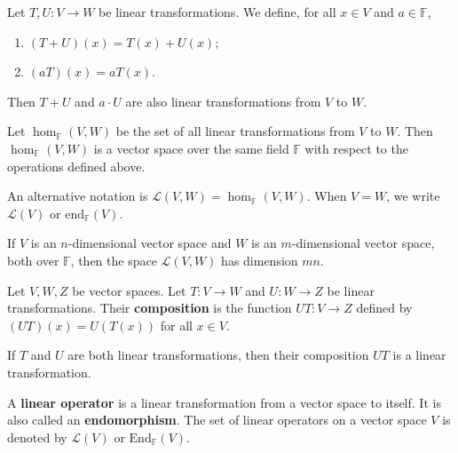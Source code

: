 \begin{theorem}
	Let $T, U : V \longrightarrow W$ be linear transformations. We define, for all $x \in V$ and $a \in \mathbb{F}$,
	\begin{enumerate}
		\item $(T+U)(x) = T(x) + U(x)$;
		\item $(aT)(x) = aT(x)$.
	\end{enumerate}

	Then $T+U$ and $a\cdot U$ are also linear transformations from $V$ to $W$.
\end{theorem}

\begin{theorem}
	Let $\hom_{\mathbb{F}}(V,W)$ be the set of all linear transformations from $V$ to $W$. Then $\hom_{\mathbb{F}}(V,W)$ is a vector space over the same field $\mathbb{F}$ with respect to the operations defined above.

	An alternative notation is $\mathcal{L}(V,W) = \hom_{\mathbb{F}}(V,W)$. When $V = W$, we write $\mathcal{L}(V)$ or $\text{end}_{\mathbb{F}}(V)$.
\end{theorem}

\begin{theorem}
	If $V$ is an $n$-dimensional vector space and $W$ is an $m$-dimensional vector space, both over $\mathbb{F}$, then the space $\mathcal{L}(V,W)$ has dimension $mn$.
\end{theorem}


\begin{definition}
	Let $V, W, Z$ be vector spaces. Let $T : V \longrightarrow W$ and $U : W \longrightarrow Z$ be linear transformations. Their \textbf{composition} is the function $UT : V \longrightarrow Z$ defined by $(UT)(x) = U(T(x))$ for all $x \in V$.
\end{definition}

\begin{theorem}
	If $T$ and $U$ are both linear transformations, then their composition $UT$ is a linear transformation.
\end{theorem}

\begin{definition}
	A \textbf{linear operator} is a linear transformation from a vector space to itself. It is also called an \textbf{endomorphism}. The set of linear operators on a vector space $V$ is denoted by $\mathcal{L}(V)$ or $\text{End}_{\mathbb{F}} (V)$.
\end{definition}

